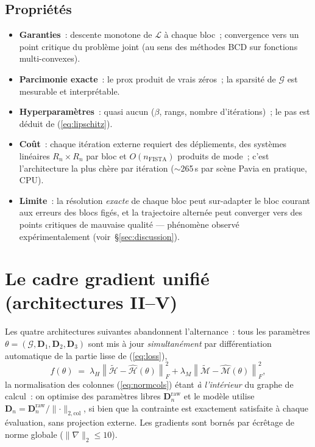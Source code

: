 \documentclass[11pt,a4paper]{article}
\newcommand{\T}[1]{\bm{\mathcal{#1}}}          %
\newcommand{\M}[1]{\bm{#1}}                     %
\newcommand{\norf}[1]{\left\lVert #1 \right\rVert_F}
\begin{document}
\subsection{Propriétés}

\begin{itemize}
  \item \textbf{Garanties}~: descente monotone de $\mathcal{L}$ à chaque bloc~;
  convergence vers un point critique du problème joint (au sens des méthodes
  BCD sur fonctions multi-convexes).
  \item \textbf{Parcimonie exacte}~: le prox produit de vrais zéros~;
  la sparsité de $\T{G}$ est mesurable et interprétable.
  \item \textbf{Hyperparamètres}~: quasi aucun ($\beta$, rangs, nombre
  d'itérations)~; le pas est déduit de (\ref{eq:lipschitz}).
  \item \textbf{Coût}~: chaque itération externe requiert des dépliements, des
  systèmes linéaires $R_n\times R_n$ par bloc et $O(n_{\text{FISTA}})$
  produits de mode~; c'est l'architecture la plus chère par itération
  ($\sim$265\,s par scène Pavia en pratique, CPU).
  \item \textbf{Limite}~: la résolution \emph{exacte} de chaque bloc peut
  sur-adapter le bloc courant aux erreurs des blocs figés, et la trajectoire
  alternée peut converger vers des points critiques de mauvaise qualité —
  phénomène observé expérimentalement (voir~\S\ref{sec:discussion}).
\end{itemize}

\section{Le cadre gradient unifié (architectures II--V)}
\label{sec:gradient}

Les quatre architectures suivantes abandonnent l'alternance~: tous les
paramètres $\theta=(\T{G},\M{D}_1,\M{D}_2,\M{D}_3)$ sont mis à jour
\emph{simultanément} par différentiation automatique de la partie lisse de
(\ref{eq:loss}),
\begin{equation}
  f(\theta) \;=\; \lambda_H\norf{\widetilde{\T{H}}-\widehat{\T{H}}(\theta)}^2
  + \lambda_M\norf{\widetilde{\T{M}}-\widehat{\T{M}}(\theta)}^2 ,
\end{equation}
la normalisation des colonnes (\ref{eq:normcols}) étant \emph{à l'intérieur}
du graphe de calcul~: on optimise des paramètres libres
$\M{D}_n^{\text{raw}}$ et le modèle utilise
$\M{D}_n=\M{D}_n^{\text{raw}}/\lVert\cdot\rVert_{2,\text{col}}$, si bien que
la contrainte est exactement satisfaite à chaque évaluation, sans projection
externe. Les gradients sont bornés par écrêtage de norme globale
($\lVert\nabla\rVert_2\le 10$).
\end{document}
